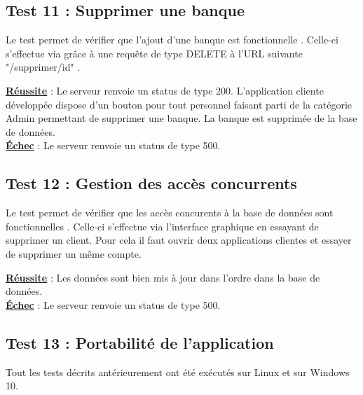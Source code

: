 \subsection{Test 11 : Supprimer une banque}

Le test permet de vérifier que l'ajout d'une banque est fonctionnelle .
Celle-ci s'effectue via grâce à une requête de type DELETE à l'URL suivante "/supprimer/{id}" .

\textbf{\underline{Réussite}} : Le serveur renvoie un status de type 200.
L'application cliente développée dispose d'un bouton pour tout personnel faisant parti de la catégorie Admin permettant de supprimer une banque. La banque est supprimée de la base de données.
\\
\textbf{\underline{Échec}} : Le serveur renvoie un status de type 500.

\subsection{Test 12 : Gestion des accès concurrents}

Le test permet de vérifier que les accès concurents à la base de données sont fonctionnelles .
Celle-ci s'effectue via l'interface graphique en essayant de supprimer un client.
Pour cela il faut ouvrir deux applications clientes et essayer de supprimer un même compte.

\textbf{\underline{Réussite}} : Les données sont bien mis à jour dans l'ordre dans la base de données.
\\
\textbf{\underline{Échec}} : Le serveur renvoie un status de type 500.

\subsection{Test 13 : Portabilité de l'application}

Tout les tests décrits antérieurement ont été exécutés sur Linux et sur Windows 10.